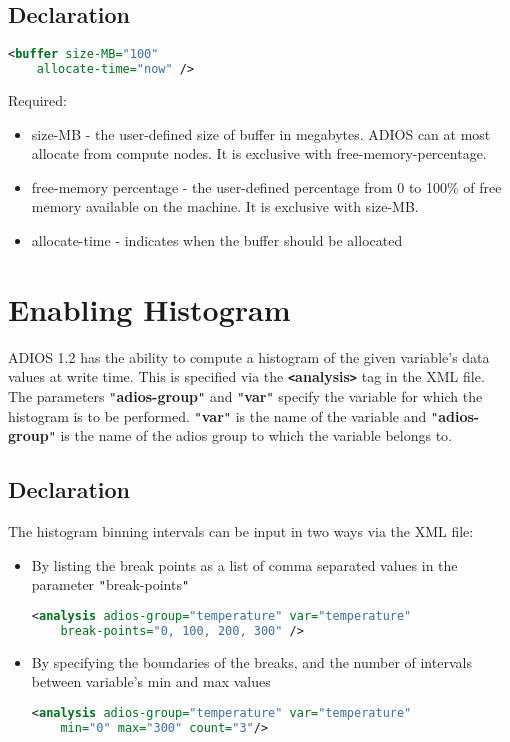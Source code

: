 \subsection{Declaration}
\begin{lstlisting}[language=XML]
<buffer size-MB="100"
	allocate-time="now" />
\end{lstlisting}

Required:
\begin{itemize}
\item size-MB - the user-defined size of  buffer in megabytes. ADIOS can at most allocate 
from compute nodes. It is exclusive with free-memory-percentage.
\item free-memory percentage - the user-defined percentage from 0 to 100\% of free memory 
available on the machine. It is exclusive with size-MB.
\item allocate-time - indicates when the buffer should be allocated
\end{itemize}

\section{Enabling Histogram}

ADIOS 1.2 has the ability to {\color{color01} compute a histogram of the given 
variable's data values at write time}. This is specified via the \textbf{\texttt{<}analysis\texttt{>}} 
tag in the XML file. The parameters \texttt{"}\textbf{adios-group}\texttt{"} and 
\texttt{"}\textbf{var}\texttt{"} specify the variable for which the histogram is 
to be performed. \texttt{"}\textbf{var}\texttt{"} is the name of the variable and 
\texttt{"}\textbf{adios-group}\texttt{"} is the name of the adios group to which 
the variable belongs to.

\subsection{Declaration}
The histogram binning intervals can be input in two ways via the XML file:
\begin{itemize}
\item By listing the break points as a list of comma separated values 
in the parameter \texttt{"}break-points\texttt{"} 
\begin{lstlisting}[language=XML]
<analysis adios-group="temperature" var="temperature"
	break-points="0, 100, 200, 300" />
\end{lstlisting}

\item By specifying the boundaries of the breaks, and the number 
of intervals between variable's min and max values
\begin{lstlisting}[language=XML]
<analysis adios-group="temperature" var="temperature"
	min="0" max="300" count="3"/>
\end{lstlisting}
\end{itemize}

